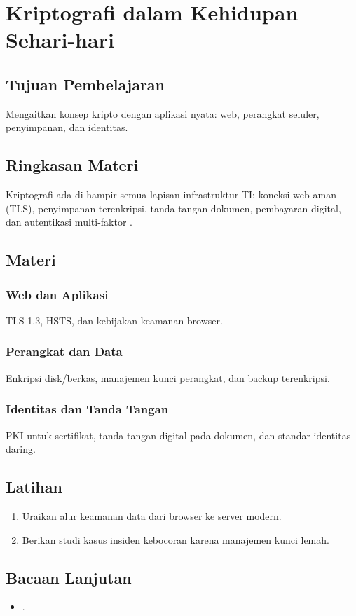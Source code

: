 \documentclass[../main.tex]{subfiles}
\begin{document}
\chapter{Kriptografi dalam Kehidupan Sehari-hari}
\section{Tujuan Pembelajaran}
Mengaitkan konsep kripto dengan aplikasi nyata: web, perangkat seluler, penyimpanan, dan identitas.

\section{Ringkasan Materi}
Kriptografi ada di hampir semua lapisan infrastruktur TI: koneksi web aman (TLS), penyimpanan terenkripsi, tanda tangan dokumen, pembayaran digital, dan autentikasi multi-faktor \citep{rfc8446,nist_sp_800_63_3}.

\section{Materi}
\subsection{Web dan Aplikasi}
TLS 1.3, HSTS, dan kebijakan keamanan browser.

\subsection{Perangkat dan Data}
Enkripsi disk/berkas, manajemen kunci perangkat, dan backup terenkripsi.

\subsection{Identitas dan Tanda Tangan}
PKI untuk sertifikat, tanda tangan digital pada dokumen, dan standar identitas daring.

\section{Latihan}
\begin{enumerate}
  \item Uraikan alur keamanan data dari browser ke server modern.
  \item Berikan studi kasus insiden kebocoran karena manajemen kunci lemah.
\end{enumerate}

\section{Bacaan Lanjutan}
\begin{itemize}
  \item \citep{rfc8446,nist_sp_800_63_3}.
\end{itemize}
\end{document}
